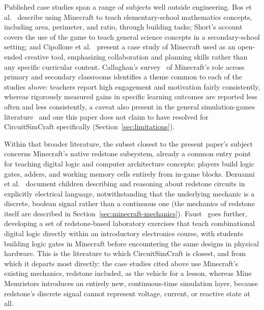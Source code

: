 Published case studies span a range of subjects well outside engineering. Bos et
al.~\cite{bos2014mathematics} describe using Minecraft to teach elementary-school
mathematics concepts, including area, perimeter, and ratio, through building tasks; Short's
account~\cite{short2012teaching} covers the use of the game to teach general science concepts
in a secondary-school setting; and Cipollone et al.~\cite{cipollone2014creative} present a
case study of Minecraft used as an open-ended creative tool, emphasizing collaboration and
planning skills rather than any specific curricular content. Callaghan's
survey~\cite{callaghan2016investigating} of Minecraft's role across primary and secondary
classrooms identifies a theme common to each of the studies above: teachers report high
engagement and motivation fairly consistently, whereas rigorously measured gains in specific
learning outcomes are reported less often and less consistently, a caveat also present in
the general simulation-games literature~\cite{sitzmann2011meta} and one this paper does not
claim to have resolved for CircuitSimCraft specifically (Section~\ref{sec:limitations}).

Within that broader literature, the subset closest to the present paper's subject concerns
Minecraft's native redstone subsystem, already a common entry point for teaching digital
logic and computer architecture concepts: players build logic gates, adders, and working
memory cells entirely from in-game blocks. Dezuanni et al.~\cite{dezuanni2015redstone}
document children describing and reasoning about redstone circuits in explicitly electrical
language, notwithstanding that the underlying mechanic is a discrete, boolean signal rather
than a continuous one (the mechanics of redstone itself are described in
Section~\ref{sec:minecraft-mechanics}). Faust~\cite{faust2024minecraft} goes further,
developing a set of redstone-based laboratory exercises that teach combinational digital
logic directly within an introductory electronics course, with students building logic gates
in Minecraft before encountering the same designs in physical hardware. This is the
literature to which CircuitSimCraft is
closest, and from which it departs most directly: the case studies cited above use
Minecraft's existing mechanics, redstone included, as the vehicle for a lesson, whereas Mine
Memristors introduces an entirely new, continuous-time simulation layer, because redstone's
discrete signal cannot represent voltage, current, or reactive state at all.

